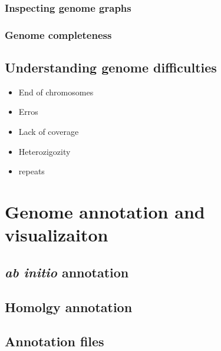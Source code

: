 \documentclass[
  letterpaper,
]{scrbook}
\begin{document}
\hypertarget{inspecting-genome-graphs}{%
\subsection*{Inspecting genome graphs}\label{inspecting-genome-graphs}}

\hypertarget{genome-completeness}{%
\subsection*{Genome completeness}\label{genome-completeness}}

\hypertarget{understanding-genome-difficulties}{%
\section*{Understanding genome
difficulties}\label{understanding-genome-difficulties}}

\begin{itemize}
\item
  End of chromosomes
\item
  Erros
\item
  Lack of coverage
\item
  Heterozigozity
\item
  repeats
\end{itemize}

\hypertarget{genome-annotation-and-visualizaiton}{%
\chapter{Genome annotation and
visualizaiton}\label{genome-annotation-and-visualizaiton}}

\hypertarget{ab-initio-annotation}{%
\section{\texorpdfstring{\emph{ab initio}
annotation}{ab initio annotation}}\label{ab-initio-annotation}}

\hypertarget{homolgy-annotation}{%
\section{Homolgy annotation}\label{homolgy-annotation}}

\hypertarget{annotation-files}{%
\section{Annotation files}\label{annotation-files}}
\end{document}
